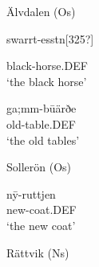Älvdalen (Os)



\item 


swarrt-esstn[325?]


black-horse.DEF\\

\glt ‘the black horse’

\z

\item 


 \ea\label{}
\gll ga;mm-b\=uärðe\\


old-table.DEF\\

\glt ‘the old tables’

\z

\item 

Sollerön (Os)



 \ea\label{}
\gll n\={y}-ruttjen\\


new-coat.DEF\\

\glt ‘the new coat’

\z

\item 

\label{bkm:Ref140983982}Rättvik (Ns)


